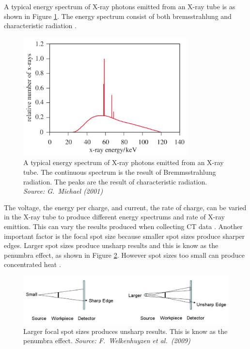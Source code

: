 \documentclass[12pt]{report}
\begin{document}
A typical energy spectrum of X-ray photons emitted from an X-ray tube is as shown in Figure \ref{fig:x_ray_spectrum}. The energy spectrum consist of both bremsstrahlung and characteristic radiation \cite{michael2001x}.

\begin{figure}
\centering
\includegraphics[width=0.8\textwidth]{figures/x_ray_spectrum.png}
\caption{A typical energy spectrum of X-ray photons emitted from an X-ray tube. The continuous spectrum is the result of Bremmsstrahlung radiation. The peaks are the result of characteristic radiation. \emph{Source: G.~Michael (2001) \cite{michael2001x}}}
\label{fig:x_ray_spectrum}
\end{figure}

The voltage, the energy per charge, and current, the rate of charge, can be varied in the X-ray tube to produce different energy spectrums and rate of X-ray emittion. This can vary the results produced when collecting CT data \cite{cantatore2011introduction}. Another important factor is the focal spot size because smaller spot sizes produce sharper edges. Larger spot sizes produce unsharp results and this is know as the penumbra effect, as shown in Figure \ref{fig:x_ray_penumbra}. However spot sizes too small can produce concentrated heat \cite{welkenhuyzen2009industrial}.

\begin{figure}
\centering
\includegraphics[width=1\textwidth]{figures/x_ray_penumbra.png}
\caption{Larger focal spot sizes produces unsharp results. This is know as the penumbra effect. \emph{Source: F.~Welkenhuyzen et al.~(2009)\cite{welkenhuyzen2009industrial}}}
\label{fig:x_ray_penumbra}
\end{figure}
\end{document}
